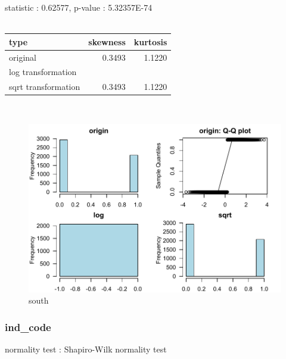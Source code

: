 \documentclass{book}\usepackage[]{graphicx}\usepackage[]{color}
\begin{document}
\noindent statistic : 0.62577,  p-value : 5.32357E-74\\
\\%
\begin{tabular}{lrr}
  \toprule
type & skewness & kurtosis \\ 
  \midrule
original & 0.3493 & 1.1220 \\ 
  log transformation &  &  \\ 
  sqrt transformation & 0.3493 & 1.1220 \\ 
   \bottomrule
\end{tabular}
\\
\begin{figure}[!ht]
\centering
\includegraphics[width=1.0\textwidth]{figure/norm12.pdf}
\caption{south}
\end{figure}
\clearpage
\subsubsection{ ind\_code }

normality test : Shapiro-Wilk normality test
\end{document}
